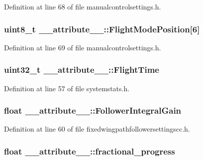 \-Definition at line 68 of file manualcontrolsettings.\-h.

\hypertarget{struct____attribute_____a3cfbb5d5e331ecaefa5d759628fc1aba}{
\subsubsection[{\-Flight\-Mode\-Position}]{\setlength{\rightskip}{0pt plus 5cm}uint8\-\_\-t {\bf \-\_\-\-\_\-attribute\-\_\-\-\_\-\-::\-Flight\-Mode\-Position}\mbox{[}6\mbox{]}}}\label{struct____attribute_____a3cfbb5d5e331ecaefa5d759628fc1aba}


\-Definition at line 69 of file manualcontrolsettings.\-h.

\hypertarget{struct____attribute_____a1ca7fc21efab1f1b6fdd67c9da07768c}{
\subsubsection[{\-Flight\-Time}]{\setlength{\rightskip}{0pt plus 5cm}uint32\-\_\-t {\bf \-\_\-\-\_\-attribute\-\_\-\-\_\-\-::\-Flight\-Time}}}\label{struct____attribute_____a1ca7fc21efab1f1b6fdd67c9da07768c}


\-Definition at line 57 of file systemstats.\-h.

\hypertarget{struct____attribute_____a732558c43bd8cbff402b59a298d4585f}{
\subsubsection[{\-Follower\-Integral\-Gain}]{\setlength{\rightskip}{0pt plus 5cm}float {\bf \-\_\-\-\_\-attribute\-\_\-\-\_\-\-::\-Follower\-Integral\-Gain}}}\label{struct____attribute_____a732558c43bd8cbff402b59a298d4585f}


\-Definition at line 60 of file fixedwingpathfollowersettingscc.\-h.

\hypertarget{struct____attribute_____a54b9c2e09ce973c29028de6f8791bf2f}{
\subsubsection[{fractional\-\_\-progress}]{\setlength{\rightskip}{0pt plus 5cm}float {\bf \-\_\-\-\_\-attribute\-\_\-\-\_\-\-::fractional\-\_\-progress}}}\label{struct____attribute_____a54b9c2e09ce973c29028de6f8791bf2f}


